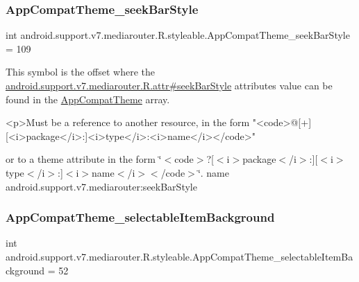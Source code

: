 \subsubsection{\texorpdfstring{App\+Compat\+Theme\+\_\+seek\+Bar\+Style}{AppCompatTheme\_seekBarStyle}}
{\footnotesize\ttfamily int android.\+support.\+v7.\+mediarouter.\+R.\+styleable.\+App\+Compat\+Theme\+\_\+seek\+Bar\+Style = 109\hspace{0.3cm}{\ttfamily [static]}}

This symbol is the offset where the \hyperlink{classandroid_1_1support_1_1v7_1_1mediarouter_1_1R_1_1attr_a6a80804b15540907133815a78dc78390}{android.\+support.\+v7.\+mediarouter.\+R.\+attr\#seek\+Bar\+Style} attribute\textquotesingle{}s value can be found in the \hyperlink{classandroid_1_1support_1_1v7_1_1mediarouter_1_1R_1_1styleable_a4e3d3900c75d49aeb2f283cac00214d6}{App\+Compat\+Theme} array.

\begin{DoxyVerb}      <p>Must be a reference to another resource, in the form "<code>@[+][<i>package</i>:]<i>type</i>:<i>name</i></code>"
\end{DoxyVerb}
 or to a theme attribute in the form \char`\"{}$<$code$>$?\mbox{[}$<$i$>$package$<$/i$>$\+:\mbox{]}\mbox{[}$<$i$>$type$<$/i$>$\+:\mbox{]}$<$i$>$name$<$/i$>$$<$/code$>$\char`\"{}.  name android.\+support.\+v7.\+mediarouter\+:seek\+Bar\+Style \mbox{\label{classandroid_1_1support_1_1v7_1_1mediarouter_1_1R_1_1styleable_ae6b277bbde29a995524dbf2f764ec5b8}} 
\subsubsection{\texorpdfstring{App\+Compat\+Theme\+\_\+selectable\+Item\+Background}{AppCompatTheme\_selectableItemBackground}}
{\footnotesize\ttfamily int android.\+support.\+v7.\+mediarouter.\+R.\+styleable.\+App\+Compat\+Theme\+\_\+selectable\+Item\+Background = 52\hspace{0.3cm}{\ttfamily [static]}}

